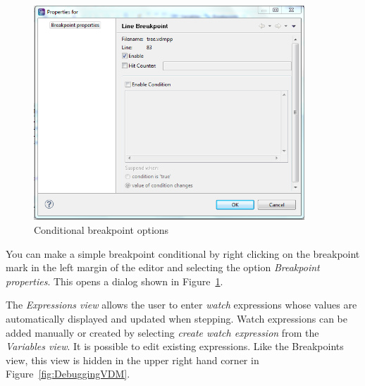 \begin{figure}[htp]
\begin{center}
  \includegraphics[width=4in]{figures/Breakpointconditional}
  \caption{Conditional breakpoint options}
  \label{fig:BreakpointConditional}
\end{center}
\end{figure}

You can make a simple breakpoint conditional by right clicking on the
breakpoint mark in the left margin of the editor and selecting the
option \emph{Breakpoint properties}. This opens a dialog shown in
Figure~\ref{fig:BreakpointConditional}.

The \emph{Expressions view} allows the user to enter \emph{watch}
expressions whose values are automatically displayed and updated when
stepping. Watch expressions can be added manually or created by
selecting \emph{create watch expression} from the \emph{Variables view}. It
is possible to edit existing expressions.  Like the Breakpoints view,
this view is hidden in the upper right hand corner in
Figure~\ref{fig:DebuggingVDM}.



